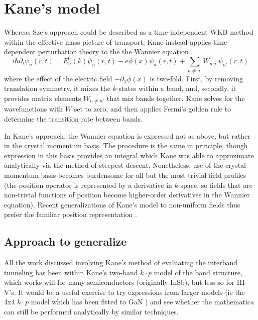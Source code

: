\section{Kane's model}
Whereas Sze's approach could be described as a time-independent WKB method within the effective mass picture of transport, Kane instead applies time-dependent perturbation theory to the the Wannier equation
$$i\hbar\partial_t\psi_n(r,t)=E_n^0(k)\psi_n(r,t)-e\phi(x)\psi_n(r,t)+\sum_{n\neq n'} W_{n\,n'}\psi_{n'}(r,t)$$
where the effect of the electric field $-\partial_x\phi(x)$ is two-fold.  First, by removing translation symmetry, it mixes the $k$-states within a band, and, secondly, it provides matrix elements $W_{n\neq n'}$ that mix bands together.  Kane solves for the wavefunctions with $W$ set to zero, and then applies Fermi's golden rule to determine the transition rate between bands.

In Kane's approach, the Wannier equation is expressed not as above, but rather in the crystal momentum basis.  The procedure is the same in principle, though expression in this basis provides an integral which Kane was able to approximate analytically via the method of steepest descent.  Nonetheless, use of the crystal momentum basis becomes burdensome for all but the most trivial field profiles (the position operator is represented by a derivative in $k$-space, so fields that are non-trivial functions of position become higher-order derivatives in the Wannier equation).  Recent generalizations of Kane's model to non-uniform fields thus prefer the familiar position representation \cite{Tanaka_1994}.

\subsection{Approach to generalize}
All the work discussed involving Kane's method of evaluating the interband tunneling has been within Kane's two-band $k\cdot p$ model of the band structure, which works will for many semiconductors (originally InSb), but less so for III-V's.  It would be a useful exercise to try expressions from larger models (ie the 4x4 $k\cdot p$ model which has been fitted to GaN \cite{Rinke_2008}) and see whether the mathematica can still be performed analytically by similar techniques.